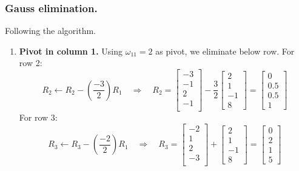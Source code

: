 \documentclass[../../../main.tex]{subfiles}
\begin{document}
\subsubsection{Gauss elimination.} 
Following the algorithm.
\begin{enumerate}
    \item \textbf{Pivot in column 1.}
          Using $\omega_{11} = 2$ as pivot, we eliminate below row.
          For row 2:
          \begin{equation*}
              R_2 \leftarrow R_2 - \left(\frac{-3}{2}\right)R_1 \quad \Rightarrow \quad
              R_2=
              \begin{bmatrix}
                  -3 \\-1\\2\\-1\\
              \end{bmatrix}
              - \frac{3 }{2}
              \begin{bmatrix}
                  2 \\1\\-1\\8
              \end{bmatrix}
              =
              \begin{bmatrix}
                  0 \\ 0.5 \\ 0.5 \\ 1
              \end{bmatrix}
          \end{equation*}
          For row 3:
          \begin{equation*}
              R_3 \leftarrow R_3 - \left(\frac{-2}{2}\right)R_1 \quad \Rightarrow \quad
              R_3=
              \begin{bmatrix}
                  -2 \\1\\2\\-3\\
              \end{bmatrix}
              +
              \begin{bmatrix}
                  2 \\1\\-1\\8
              \end{bmatrix}
              =
              \begin{bmatrix}
                  0 \\ 2 \\ 1 \\ 5

\end{bmatrix}
\end{equation*}
\end{enumerate}
\end{document}
